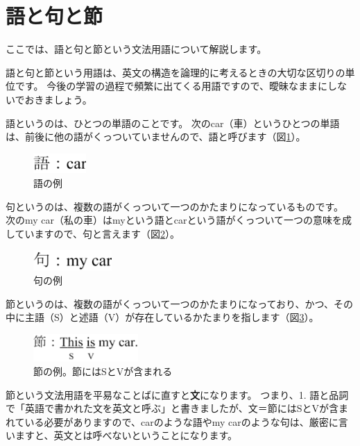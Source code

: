 \documentclass[12pt,titlepage]{jsarticle}
\begin{document}
 \section{語と句と節}
 ここでは、語と句と節という文法用語について解説します。
 
 語と句と節という用語は、英文の構造を論理的に考えるときの大切な区切りの単位です。
 今後の学習の過程で頻繁に出てくる用語ですので、曖昧なままにしないでおきましょう。

 語というのは、ひとつの単語のことです。
 次のcar（車）というひとつの単語は、前後に他の語がくっついていませんので、語と呼びます（図\ref{fig4}）。
  \begin{figure}[htbp]
   \begin{center}
    \includegraphics[width=2cm]{./figure/fig4.pdf}
    \caption{語の例}
    \label{fig4}
   \end{center}
  \end{figure}

  句というのは、複数の語がくっついて一つのかたまりになっているものです。
  次のmy car（私の車）はmyという語とcarという語がくっついて一つの意味を成していますので、句と言えます（図\ref{fig5}）。
  \begin{figure}[htbp]
   \begin{center}
    \includegraphics[width=3cm]{./figure/fig5.pdf}
    \caption{句の例}
    \label{fig5}
   \end{center}
  \end{figure}


  節というのは、複数の語がくっついて一つのかたまりになっており、かつ、その中に主語（S）と述語（V）が存在しているかたまりを指します（図\ref{fig6}）。
  \begin{figure}[htbp]
   \begin{center}
    \includegraphics[width=4cm]{./figure/fig6.pdf}
    \caption{節の例。節にはSとVが含まれる}
    \label{fig6}
   \end{center}
  \end{figure}


  節という文法用語を平易なことばに直すと{\bf 文}になります。
  つまり、1. 語と品詞で「英語で書かれた文を英文と呼ぶ」と書きましたが、文＝節にはSとVが含まれている必要がありますので、carのような語やmy carのような句は、厳密に言いますと、英文とは呼べないということになります。
\end{document}
